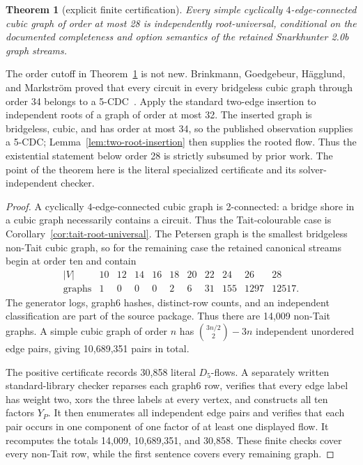\documentclass[11pt]{article}
\newtheorem{theorem}{Theorem}
\theoremstyle{definition}
\theoremstyle{remark}
\begin{document}
\begin{theorem}[explicit finite certification]\label{thm:root-frontier-28}
Every simple cyclically \(4\)-edge-connected cubic graph of order at most
28 is independently root-universal, conditional on the documented
completeness and option semantics of the retained Snarkhunter 2.0b graph
streams.
\end{theorem}

The order cutoff in Theorem~\ref{thm:root-frontier-28} is not new.
Brinkmann, Goedgebeur, H\"agglund, and Markstr\"om proved that every circuit
in every bridgeless cubic graph through order 34 belongs to a
5-CDC~\cite[Observation~6.6]{BrinkmannEtAl2013}.  Apply the standard
two-edge insertion to independent roots of a graph of order at most 32.
The inserted graph is bridgeless, cubic, and has order at most 34, so the
published observation supplies a 5-CDC; Lemma~\ref{lem:two-root-insertion}
then supplies the rooted flow.  Thus the existential statement below order
28 is strictly subsumed by prior work.  The point of the theorem here is the
literal specialized certificate and its solver-independent checker.

\begin{proof}
A cyclically $4$-edge-connected cubic graph is 2-connected: a bridge
shore in a cubic graph necessarily contains a circuit.  Thus the
Tait-colourable case is Corollary~\ref{cor:tait-root-universal}.  The
Petersen graph is the smallest bridgeless non-Tait cubic graph, so for the
remaining case the retained canonical streams begin at order ten and contain
\[
\begin{array}{c|rrrrrrrrrr}
 |V|&10&12&14&16&18&20&22&24&26&28\\ \hline
 \text{graphs}&1&0&0&0&2&6&31&155&1297&12517.
\end{array}
\]
The generator logs, graph6 hashes, distinct-row counts, and an independent
classification are part of the source package.  Thus there are 14,009
non-Tait graphs.  A simple cubic graph of order \(n\) has
\(\binom{3n/2}{2}-3n\) independent unordered edge pairs, giving 10,689,351
pairs in total.

The positive certificate records 30,858 literal \(D_5\)-flows.  A separately
written standard-library checker reparses each graph6 row, verifies that
every edge label has weight two, xors the three labels at every vertex,
and constructs all ten factors \(Y_P\).  It then enumerates all independent
edge pairs and verifies that each pair occurs in one component of one
factor of at least one displayed flow.  It recomputes the totals 14,009,
10,689,351, and 30,858.  These finite checks cover every non-Tait row, while the
first sentence covers every remaining graph.
\end{proof}
\end{document}
